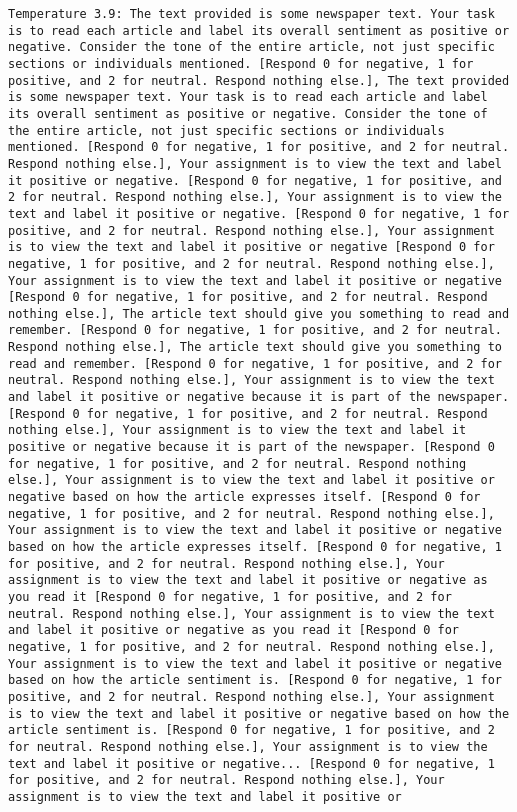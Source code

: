 \begin{lstlisting}[label=lst:poor_performing_prompts]
	Temperature 3.9: The text provided is some newspaper text. Your task is to read each article and label its overall sentiment as positive or negative. Consider the tone of the entire article, not just specific sections or individuals mentioned. [Respond 0 for negative, 1 for positive, and 2 for neutral. Respond nothing else.], The text provided is some newspaper text. Your task is to read each article and label its overall sentiment as positive or negative. Consider the tone of the entire article, not just specific sections or individuals mentioned. [Respond 0 for negative, 1 for positive, and 2 for neutral. Respond nothing else.], Your assignment is to view the text and label it positive or negative. [Respond 0 for negative, 1 for positive, and 2 for neutral. Respond nothing else.], Your assignment is to view the text and label it positive or negative. [Respond 0 for negative, 1 for positive, and 2 for neutral. Respond nothing else.], Your assignment is to view the text and label it positive or negative [Respond 0 for negative, 1 for positive, and 2 for neutral. Respond nothing else.], Your assignment is to view the text and label it positive or negative [Respond 0 for negative, 1 for positive, and 2 for neutral. Respond nothing else.], The article text should give you something to read and remember. [Respond 0 for negative, 1 for positive, and 2 for neutral. Respond nothing else.], The article text should give you something to read and remember. [Respond 0 for negative, 1 for positive, and 2 for neutral. Respond nothing else.], Your assignment is to view the text and label it positive or negative because it is part of the newspaper. [Respond 0 for negative, 1 for positive, and 2 for neutral. Respond nothing else.], Your assignment is to view the text and label it positive or negative because it is part of the newspaper. [Respond 0 for negative, 1 for positive, and 2 for neutral. Respond nothing else.], Your assignment is to view the text and label it positive or negative based on how the article expresses itself. [Respond 0 for negative, 1 for positive, and 2 for neutral. Respond nothing else.], Your assignment is to view the text and label it positive or negative based on how the article expresses itself. [Respond 0 for negative, 1 for positive, and 2 for neutral. Respond nothing else.], Your assignment is to view the text and label it positive or negative as you read it [Respond 0 for negative, 1 for positive, and 2 for neutral. Respond nothing else.], Your assignment is to view the text and label it positive or negative as you read it [Respond 0 for negative, 1 for positive, and 2 for neutral. Respond nothing else.], Your assignment is to view the text and label it positive or negative based on how the article sentiment is. [Respond 0 for negative, 1 for positive, and 2 for neutral. Respond nothing else.], Your assignment is to view the text and label it positive or negative based on how the article sentiment is. [Respond 0 for negative, 1 for positive, and 2 for neutral. Respond nothing else.], Your assignment is to view the text and label it positive or negative... [Respond 0 for negative, 1 for positive, and 2 for neutral. Respond nothing else.], Your assignment is to view the text and label it positive or 
\end{lstlisting}
